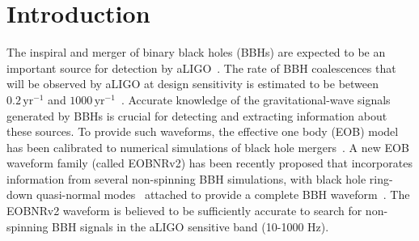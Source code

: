 
\section{Introduction}

The inspiral and merger of binary black holes (BBHs) are expected to be an important source for detection by
aLIGO~\cite{300yrsofGravitation}.  The rate of BBH coalescences that will be
observed by aLIGO at design sensitivity is estimated to be between
$0.2\,\mathrm{yr}^{-1}$ and $1000\,\mathrm{yr}^{-1}$~\cite{LSCCBCRates2010}.
Accurate knowledge of the gravitational-wave signals generated by BBHs is
crucial for detecting and extracting information about these sources.  
To provide such waveforms, the effective one body (EOB)
model~\cite{EOBOriginalBuonannoDamour} has been calibrated to numerical
simulations of black hole
mergers~\cite{EOBNR01,EOBNRdevel01,EOBNRdevel02,EOBNRdevel03,EOBNRdevel04,EOBdevel01,EOBdevel02,BuonannoEOBv2Main}.
A new EOB waveform family (called EOBNRv2) has been recently proposed that
incorporates information from several non-spinning BBH simulations, with black
hole ring-down quasi-normal modes~\cite{BHRDQNMs,BHPTMinoSasaki} attached to
provide a complete BBH waveform~\cite{BuonannoEOBv2Main}.  The EOBNRv2
waveform is believed to be sufficiently accurate to search for non-spinning
BBH signals in the aLIGO sensitive band (10-1000 Hz). 

